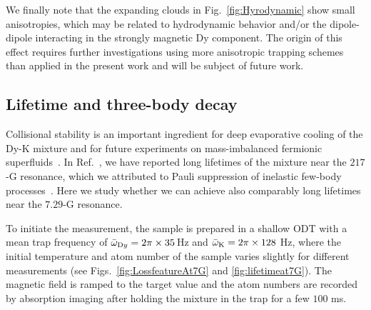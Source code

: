 We finally note that the expanding clouds in Fig.~\ref{fig:Hyrodynamic} show small anisotropies, which may be related to hydrodynamic behavior and/or the dipole-dipole interacting in the strongly magnetic Dy component. The origin of this effect requires further investigations using more anisotropic trapping schemes than applied in the present work and will be subject of future work.

\subsection{Lifetime and three-body decay}
\label{sec:Lifetime}

Collisional stability is an important ingredient for deep evaporative cooling of the Dy-K mixture and for future experiments on mass-imbalanced fermionic superfluids~\cite{Gubbels2013ifg,Wang2017eeo,Pini2021bmf}. In Ref.~\cite{Ravensbergen2020rif}, we have reported long lifetimes of the mixture near the $217$-G resonance, which we attributed to Pauli suppression of inelastic few-body processes~\cite{Petrov2004wbd,Petrov2005dmi}. Here we study whether we can achieve also comparably long lifetimes near the $7.29$-G resonance.

To initiate the measurement, the sample is prepared in a shallow ODT with a mean trap frequency of $\bar{\omega}_{\textrm Dy}=2\pi\times35$\,Hz and $\bar{\omega}_{\textrm K}=2\pi\times128$ Hz, where the initial temperature and atom number of the sample varies slightly for different measurements (see Figs.~\ref{fig:LossfeatureAt7G} and \ref{fig:lifetimeat7G}). The magnetic field is ramped to the target value and the atom numbers are recorded by absorption imaging after holding the mixture in the trap for {a few $100$ ms}. 

